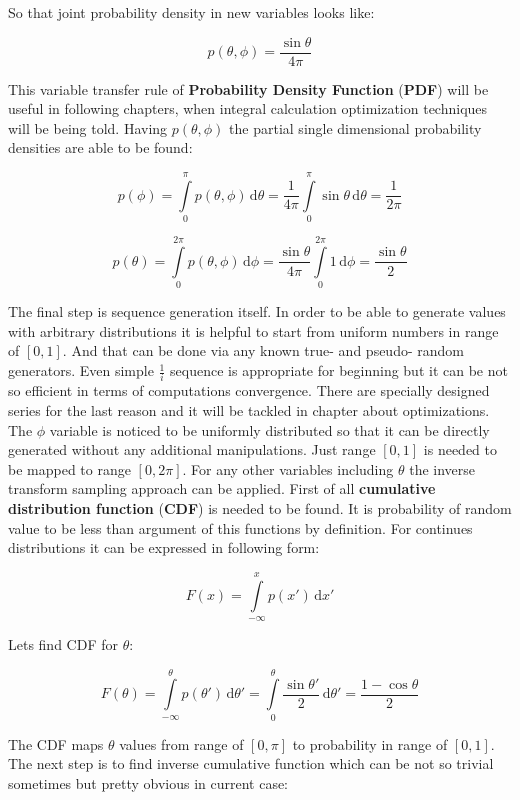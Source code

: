 So that joint probability density in new variables looks like\+:

\[p(\theta, \phi) = \frac{\sin\theta}{4\pi}\]

This variable transfer rule of {\bfseries Probability Density Function} ({\bfseries P\+DF}) will be useful in following chapters, when integral calculation optimization techniques will be being told. Having $p(\theta, \phi)$ the partial single dimensional probability densities are able to be found\+:

\[p(\phi) = \int\limits_0^\pi p(\theta, \phi)\, \mathrm{d}\theta = \frac{1}{4\pi} \int\limits_0^\pi \sin\theta\, \mathrm{d}\theta = \frac{1}{2\pi}\]

\[p(\theta) = \int\limits_0^{2\pi} p(\theta, \phi)\, \mathrm{d}\phi = \frac{\sin\theta}{4\pi}\int\limits_0^{2\pi}1\, \mathrm{d}\phi = \frac{\sin\theta}{2}\]

The final step is sequence generation itself. In order to be able to generate values with arbitrary distributions it is helpful to start from uniform numbers in range of $[0, 1]$. And that can be done via any known true-\/ and pseudo-\/ random generators. Even simple $\frac{1}{i}$ sequence is appropriate for beginning but it can be not so efficient in terms of computations convergence. There are specially designed series for the last reason and it will be tackled in chapter about optimizations. The $\phi$ variable is noticed to be uniformly distributed so that it can be directly generated without any additional manipulations. Just range $[0, 1]$ is needed to be mapped to range $[0, 2\pi]$. For any other variables including $\theta$ the inverse transform sampling approach can be applied. First of all {\bfseries cumulative distribution function} ({\bfseries C\+DF}) is needed to be found. It is probability of random value to be less than argument of this functions by definition. For continues distributions it can be expressed in following form\+:

\[F(x) = \int\limits_{-\infty}^x p(x')\, \mathrm{d}x'\]

Lets find C\+DF for $\theta$\+:

\[F(\theta) = \int\limits_{-\infty}^\theta p(\theta')\, \mathrm{d}\theta' = \int\limits_0^\theta \frac{\sin\theta'}{2}\, \mathrm{d}\theta' = \frac{1-\cos\theta}{2}\]

The C\+DF maps $\theta$ values from range of $[0, \pi]$ to probability in range of $[0, 1]$. The next step is to find inverse cumulative function which can be not so trivial sometimes but pretty obvious in current case\+:

